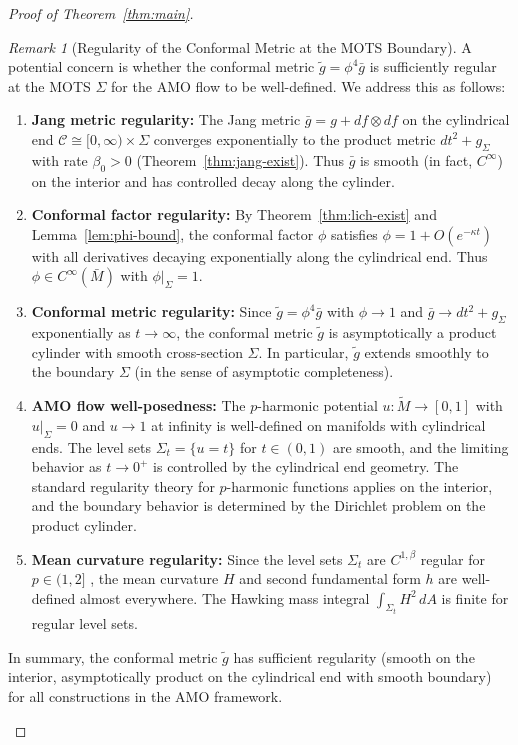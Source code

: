 \documentclass[12pt]{article}
\theoremstyle{plain}
\theoremstyle{definition}
\theoremstyle{remark}
\newtheorem{remark}[theorem]{Remark}
\newcommand{\Hoelder}{\beta}
\begin{document}
\begin{proof}[Proof of Theorem~\ref{thm:main}]
\begin{remark}[Regularity of the Conformal Metric at the MOTS Boundary]\label{rem:conformal-regularity-mots}
A potential concern is whether the conformal metric $\tilde{g} = \phi^4 \bar{g}$ is sufficiently regular at the MOTS $\Sigma$ for the AMO flow to be well-defined. We address this as follows:
\begin{enumerate}
    \item \textbf{Jang metric regularity:} The Jang metric $\bar{g} = g + df \otimes df$ on the cylindrical end $\mathcal{C} \cong [0,\infty) \times \Sigma$ converges exponentially to the product metric $dt^2 + g_\Sigma$ with rate $\beta_0 > 0$ (Theorem~\ref{thm:jang-exist}). Thus $\bar{g}$ is smooth (in fact, $C^\infty$) on the interior and has controlled decay along the cylinder.
    
    \item \textbf{Conformal factor regularity:} By Theorem~\ref{thm:lich-exist} and Lemma~\ref{lem:phi-bound}, the conformal factor $\phi$ satisfies $\phi = 1 + O(e^{-\kappa t})$ with all derivatives decaying exponentially along the cylindrical end. Thus $\phi \in C^\infty(\bar{M})$ with $\phi|_\Sigma = 1$.
    
    \item \textbf{Conformal metric regularity:} Since $\tilde{g} = \phi^4 \bar{g}$ with $\phi \to 1$ and $\bar{g} \to dt^2 + g_\Sigma$ exponentially as $t \to \infty$, the conformal metric $\tilde{g}$ is asymptotically a product cylinder with smooth cross-section $\Sigma$. In particular, $\tilde{g}$ extends smoothly to the boundary $\Sigma$ (in the sense of asymptotic completeness).
    
    \item \textbf{AMO flow well-posedness:} The $p$-harmonic potential $u: \tilde{M} \to [0,1]$ with $u|_\Sigma = 0$ and $u \to 1$ at infinity is well-defined on manifolds with cylindrical ends. The level sets $\Sigma_t = \{u = t\}$ for $t \in (0,1)$ are smooth, and the limiting behavior as $t \to 0^+$ is controlled by the cylindrical end geometry. The standard regularity theory for $p$-harmonic functions \cite{heinonen1993, tolksdorf1984} applies on the interior, and the boundary behavior is determined by the Dirichlet problem on the product cylinder.
    
    \item \textbf{Mean curvature regularity:} Since the level sets $\Sigma_t$ are $C^{1,\Hoelder}$ regular for $p \in (1,2]$ \cite{amo2022}, the mean curvature $H$ and second fundamental form $h$ are well-defined almost everywhere. The Hawking mass integral $\int_{\Sigma_t} H^2 \, dA$ is finite for regular level sets.
\end{enumerate}
In summary, the conformal metric $\tilde{g}$ has sufficient regularity (smooth on the interior, asymptotically product on the cylindrical end with smooth boundary) for all constructions in the AMO framework.
\end{remark}


\end{proof}
\end{document}
